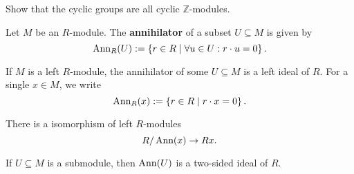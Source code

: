 \begin{ex}
   Show that the cyclic groups are all cyclic $\mathbb{Z}$-modules. 
\end{ex}
\begin{definition}[Annihilator]
   Let $M$ be an $R$-module. The \textbf{annihilator} of a subset $U \subseteq M$ is given by \[
   \operatorname{\text{Ann}}_R(U):=\left\{r \in R \mid \forall u \in U: r \cdot u =0\right\} 
   .\] 
\end{definition}
If $M$ is a left $R$-module, the annihilator of some $U \subseteq M$ is a left ideal of $R$. For a single $x \in M$, we write \[
\operatorname{\text{Ann}}_R(x):=\left\{r \in R \mid r \cdot x = 0\right\} 
.\] 
\begin{corollary}
    There is a isomorphism of left $R$-modules \[
    R / \operatorname{\text{Ann}}(x) \to Rx
    .\] 
\end{corollary}
\begin{prop}
    If $U \subseteq M$ is a submodule, then $\operatorname{\text{Ann}}(U)$ is a two-sided ideal of $R$.
\end{prop}
